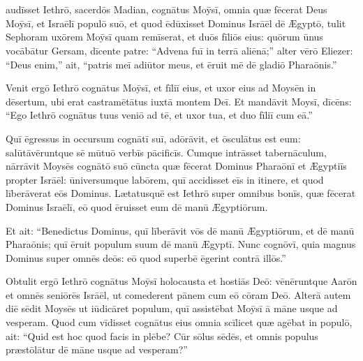 \chapter{}


\thispagestyle{empty}

 audīsset Iethrō, sacerdōs Mad\-ian, cognātus Moȳsī,
omnia quæ fēcerat Deus Moȳsī, et Israēlī populō suō, et
quod ēdūxisset Dominus Isrāēl dē Ægyptō, 
tulit Sephoram
uxōrem Moȳsī quam remīserat, 
et duōs fīliōs eius: quōrum ūnus vocābātur
Gersam, dīcente patre: ``Advena fuī in terrā aliēnā;'' 
alter vērō Eliezer:
``Deus enim,'' ait, ``patris meī adiūtor
meus, et ēruit mē dē gladiō Pharaōnis.'' 

Venit ergō Iethrō
cognātus Moȳsī, et fīliī eius, et uxor eius ad Moysēn in
dēsertum, ubi erat castramētātus iuxtā
montem Deī. 
Et mandāvit Moysī, dīcēns: ``Ego Iethrō cognātus tuus veniō
ad tē, et uxor tua, et duo fīliī cum eā.'' 

Quī ēgressus in occursum
cognātī suī, adōrāvit, et ōsculātus est eum:
salūtāvēruntque sē mūtuō verbīs pācificīs. Cumque intrāsset
tabernāculum, 
nārrāvit Moysēs
cognātō suō cūncta quæ fēcerat Dominus
Pharaōnī et Ægyptiīs propter Isrāēl: ūniversumque labōrem,
quī accidisset eīs in itinere, et quod līberāverat eōs Dominus.
Lætatusquē est Iethrō super omnibus bonīs, quæ fēcerat Dominus Israēlī, eō
quod ēruisset eum dē manū Ægyptiōrum. 

Et ait: ``Benedictus Dominus, quī līberāvit vōs dē manū Ægyptiōrum, et dē manū
Pharaōnis; quī ēruit populum suum dē manū Ægyptī. 
Nunc cognōvī, quia
magnus Dominus super omnēs deōs: eō quod superbē ēgerint contrā illōs.''

Obtulit ergō Iethrō cognātus Moȳsī holocausta et hostiās Deō: vēnēruntque Aarōn et omnēs seniōrēs
Isrāēl, ut comederent pānem cum eō cōram
Deō. 
Alterā autem diē sēdit Moysēs ut iūdicāret populum, quī assistēbat Moȳsī ā māne usque
ad vesperam. 
Quod cum vīdisset cognātus
eius omnia scīlicet quæ agēbat in populō, ait: ``Quid est hoc quod facis in
plēbe? Cūr sōlus sēdēs, et omnis populus
præstōlātur dē māne usque ad vesperam?''

